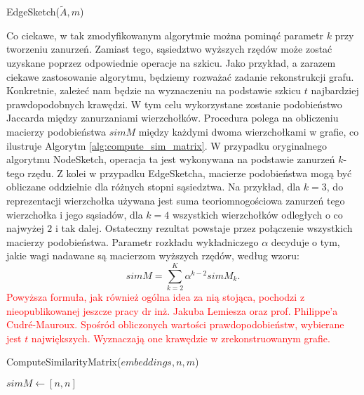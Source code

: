     \begin{algorithm}
        \caption{EdgeSketch($\tilde{A},m$)}\label{alg:edge_sketch}
    \end{algorithm}

    Co ciekawe, w tak zmodyfikowanym algorytmie można pominąć parametr $k$ przy tworzeniu zanurzeń. Zamiast tego, sąsiedztwo wyższych rzędów może zostać uzyskane poprzez odpowiednie operacje na szkicu. Jako przykład, a zarazem ciekawe zastosowanie algorytmu, będziemy rozważać zadanie rekonstrukcji grafu. Konkretnie, zależeć nam będzie na wyznaczeniu na podstawie szkicu $t$ najbardziej prawdopodobnych krawędzi. W tym celu wykorzystane zostanie podobieństwo Jaccarda między zanurzaniami wierzchołków. Procedura polega na obliczeniu macierzy podobieństwa $simM$ między każdymi dwoma wierzchołkami w grafie, co ilustruje Algorytm \ref{alg:compute_sim_matrix}. W przypadku oryginalnego algorytmu NodeSketch, operacja ta jest wykonywana na podstawie zanurzeń $k$-tego rzędu. Z kolei w przypadku EdgeSketcha, macierze podobieństwa mogą być obliczane oddzielnie dla różnych stopni sąsiedztwa. Na przykład, dla $k = 3$, do reprezentacji wierzchołka używana jest suma teoriomnogościowa zanurzeń tego wierzchołka i jego sąsiadów, dla $k = 4$ wszystkich wierzchołków odległych o co najwyżej $2$ i tak dalej. Ostateczny rezultat powstaje przez połączenie wszystkich macierzy podobieństwa. Parametr rozkładu wykładniczego $\alpha$ decyduje o tym, jakie wagi nadawane są macierzom wyższych rzędów, według wzoru:
    \begin{equation}  \label{eq:sim_matrix}  
        simM = \sum\limits_{k = 2}^{K} \alpha^{k-2} simM_{k}.
    \end{equation}
    \textcolor{red}{Powyższa formuła, jak również ogólna idea za nią stojąca, pochodzi z nieopublikowanej jeszcze pracy dr inż. Jakuba Lemiesza oraz prof. Philippe'a Cudré-Mauroux. Spośród obliczonych wartości prawdopodobieństw, wybierane jest $t$ największych. Wyznaczają one krawędzie w zrekonstruowanym grafie.} 
    
    \begin{algorithm}
        \caption{ComputeSimilarityMatrix($embeddings, n, m$)}\label{alg:compute_sim_matrix}
        $simM \gets [n,n]$ 
    \end{algorithm}
